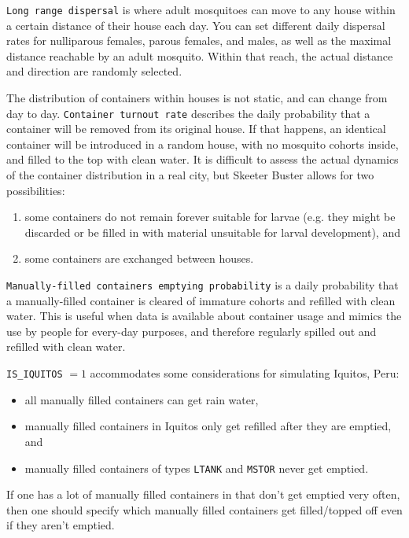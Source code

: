 \documentclass[11pt]{article}
\newcommand{\linecmd}[1]{\texttt{#1}}
\begin{document}
\bigskip{}

\linecmd{Long range dispersal} is where adult mosquitoes can move to any house within a certain distance of their house each day. You can set different daily dispersal rates for nulliparous females, parous females, and males, as well as the maximal distance reachable by an adult mosquito. Within that reach, the actual distance and direction are randomly selected. 

\bigskip{}

The distribution of containers within houses is not static, and can change from day to day. \linecmd{Container turnout rate} describes the daily probability that a container will be removed from its original house. If that happens, an identical container will be introduced in a random house, with no mosquito cohorts inside, and filled to the top with clean water. It is difficult to assess the actual dynamics of the container distribution in a real city, but Skeeter Buster allows for two possibilities: 
\begin{enumerate}
\item some containers do not remain forever suitable for larvae (e.g. they might be discarded or be filled in with material unsuitable for larval development), and
\item some containers are exchanged between houses.
\end{enumerate}

\linecmd{Manually-filled containers emptying probability} is a daily probability that a manually-filled container is cleared of immature cohorts and refilled with clean water. This is useful when data is available about container usage and mimics the use by people for every-day purposes, and therefore regularly spilled out and refilled with clean water.

\linecmd{IS\_IQUITOS} $=1$ accommodates some considerations for simulating Iquitos, Peru:\label{IsIquitos} 

\begin{itemize}
	\item all manually filled containers can get rain water,
	\item manually filled containers in Iquitos only get refilled after they
are emptied, and
	\item manually filled containers of types \linecmd{LTANK} and \linecmd{MSTOR} never get emptied.
\end{itemize}

If one has a lot of manually filled containers in that don't get emptied very often, then one
should specify which manually filled containers get filled/topped off even if they aren't emptied.%
\end{document}
